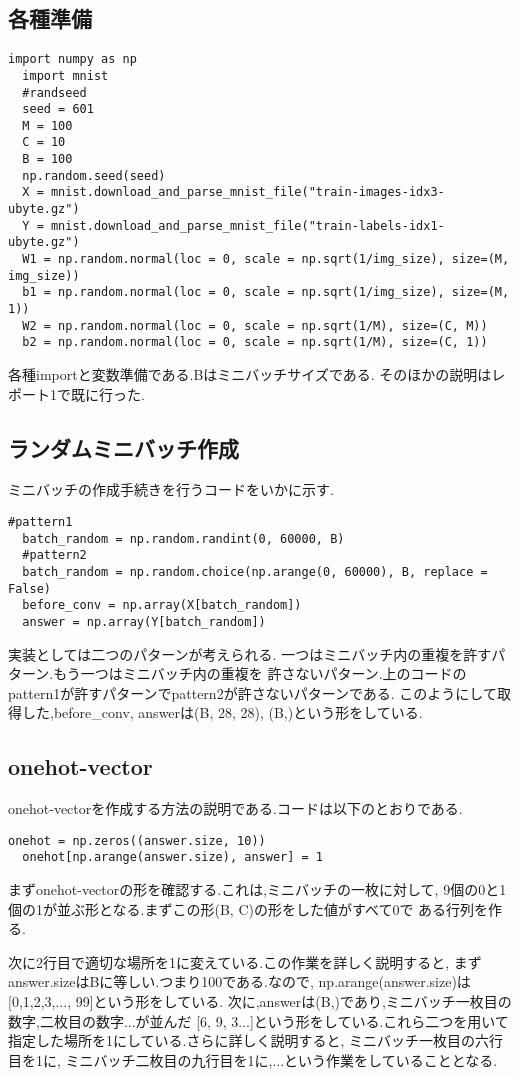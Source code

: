 \documentclass[a4paper,11pt]{jsarticle}
\begin{document}
\subsection*{各種準備}
\begin{lstlisting}[caption=準備]
  import numpy as np
  import mnist
  #randseed
  seed = 601
  M = 100
  C = 10
  B = 100
  np.random.seed(seed)
  X = mnist.download_and_parse_mnist_file("train-images-idx3-ubyte.gz")
  Y = mnist.download_and_parse_mnist_file("train-labels-idx1-ubyte.gz")
  W1 = np.random.normal(loc = 0, scale = np.sqrt(1/img_size), size=(M, img_size))
  b1 = np.random.normal(loc = 0, scale = np.sqrt(1/img_size), size=(M, 1))
  W2 = np.random.normal(loc = 0, scale = np.sqrt(1/M), size=(C, M))
  b2 = np.random.normal(loc = 0, scale = np.sqrt(1/M), size=(C, 1))
\end{lstlisting}
\par
各種importと変数準備である.Bはミニバッチサイズである.
そのほかの説明はレポート1で既に行った.

\subsection*{ランダムミニバッチ作成}
ミニバッチの作成手続きを行うコードをいかに示す.
\begin{lstlisting}[caption=ミニバッチ]
  #pattern1
  batch_random = np.random.randint(0, 60000, B)
  #pattern2
  batch_random = np.random.choice(np.arange(0, 60000), B, replace = False)
  before_conv = np.array(X[batch_random])
  answer = np.array(Y[batch_random])
\end{lstlisting}
実装としては二つのパターンが考えられる.
一つはミニバッチ内の重複を許すパターン.もう一つはミニバッチ内の重複を
許さないパターン.上のコードのpattern1が許すパターンでpattern2が許さないパターンである.
このようにして取得した,before\_conv, answerは(B, 28, 28), (B,)という形をしている.

\subsection*{onehot-vector}
onehot-vectorを作成する方法の説明である.コードは以下のとおりである.
\begin{lstlisting}[caption=onehot-vector]
  onehot = np.zeros((answer.size, 10))
  onehot[np.arange(answer.size), answer] = 1
\end{lstlisting}
まずonehot-vectorの形を確認する.これは,ミニバッチの一枚に対して,
9個の0と1個の1が並ぶ形となる.まずこの形(B, C)の形をした値がすべて0で
ある行列を作る.
\par 
次に2行目で適切な場所を1に変えている.この作業を詳しく説明すると,
まずanswer.sizeはBに等しい.つまり100である.なので,
np.arange(answer.size)は[0,1,2,3,..., 99]という形をしている.
次に,answerは(B,)であり,ミニバッチ一枚目の数字,二枚目の数字...が並んだ
[6, 9, 3...]という形をしている.これら二つを用いて指定した場所を1にしている.さらに詳しく説明すると,
ミニバッチ一枚目の六行目を1に, ミニバッチ二枚目の九行目を1に,...という作業をしていることとなる.
\end{document}
